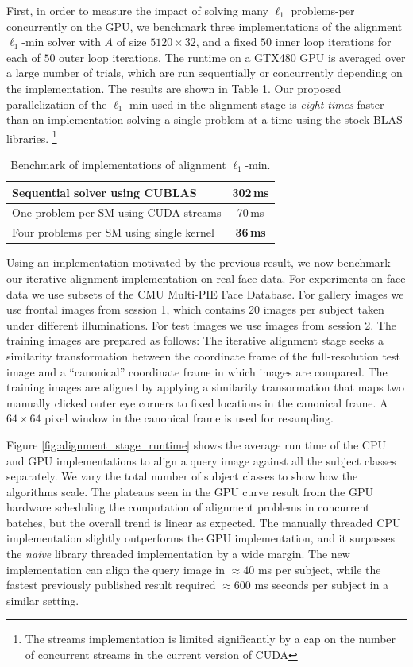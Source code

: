 \documentclass[preprint]{sigplanconf}
\begin{document}
First, in order to measure the impact of solving many
$\ell_1$ problems-per concurrently on the GPU, we benchmark three implementations of the
alignment $\ell_1$-min solver with $A$ of size $5120 \times 32$, and a fixed
$50$ inner loop iterations for each of $50$ outer loop iterations. The runtime
on a GTX480 GPU is averaged over a large number of trials, which are run
sequentially or concurrently depending on the implementation.
The results are shown in Table \ref{tbl:ubench}.
Our proposed parallelization of the $\ell_1$-min used in the alignment
stage is {\em eight times} faster than an implementation solving a single
problem at a time using the stock BLAS libraries.
\footnote{The streams implementation is limited significantly by a 
cap on the number of concurrent streams in the current version of CUDA}
\begin{table}[t!]
\caption{\small Benchmark of implementations of alignment $\ell_1$-min.}
\small
\begin{tabular}{|l|c|}
\hline
Sequential solver using CUBLAS & 302\,ms \\
\hline
One problem per SM using CUDA streams & 70\,ms  \\
\hline
Four problems per SM using single kernel & {\bf 36\,ms} \\
\hline
\end{tabular} \vspace{-0.1in}
\label{tbl:ubench}
\end{table}
 
Using an implementation motivated by the previous result, we now benchmark our
iterative alignment implementation on real face data.  For experiments on face
data we use subsets of the CMU Multi-PIE Face Database.  For gallery images we
use frontal images from session 1, which contains 20 images per subject taken
under different illuminations. For test images we use images from session 2.
The training images are prepared as follows: The iterative alignment stage
seeks a similarity transformation between the coordinate frame of the
full-resolution test image and a ``canonical'' coordinate frame in which images
are compared.  The training images are aligned by applying a similarity
transormation that maps two manually clicked outer eye corners to fixed
locations in the canonical frame.  A $64 \times 64$
pixel window in the canonical frame is used for resampling. 

Figure \ref{fig:alignment_stage_runtime} shows the average run time of the CPU and GPU implementations to align
a query image against all the subject classes separately. We vary the total number of
subject classes to show how the algorithms scale. The plateaus seen in the GPU curve
result from the GPU hardware scheduling the computation of alignment
problems in concurrent batches, but the overall trend is linear as expected.
The manually threaded CPU implementation slightly outperforms the GPU implementation,
and it surpasses the \emph{naive}
library threaded implementation by a wide margin.
The new implementation can align the query
image in $\approx 40$ ms per subject, 
while the fastest previously published result \cite{WagnerA2011-PAMI}
required $\approx 600$ ms seconds per subject in a similar setting.  
\end{document}
